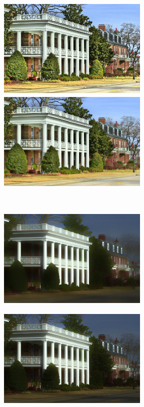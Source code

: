 \begin{figure}[htbp]
\begin{minipage}[b]{0.49\hsize}
		 \label{fig. decomp_wvm}
	\end{minipage}\\
	\begin{minipage}[b]{0.49\hsize}
	\centering
	\includegraphics[width=72mm, height=48mm]{images/experiment/decomp/jiep/reflectance.eps}
	\end{minipage}
	\begin{minipage}[b]{0.49\hsize}
	\centering
	\includegraphics[width=72mm, height=48mm]{images/experiment/decomp/prop/reflectance.eps}
	\end{minipage}\\
	\vspace{1.5mm}
	\begin{minipage}[b]{0.49\hsize}
	\centering
	\includegraphics[width=72mm, height=48mm]{images/experiment/decomp/jiep/illumination.eps}
	 \label{fig. decomp_jiep}
	\end{minipage}
	\begin{minipage}[b]{0.49\hsize}
	\centering
	\includegraphics[width=72mm, height=48mm]{images/experiment/decomp/prop/illumination.eps}

\end{minipage}
\end{figure}
